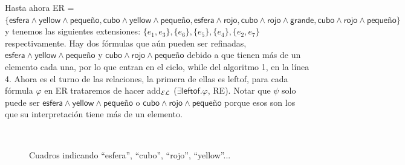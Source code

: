 Hasta ahora ER = $\{\textsf{esfera} \wedge \textsf{yellow} \wedge \textsf{peque\~no}, \textsf{cubo} \wedge \textsf{yellow} \wedge \textsf{peque\~no}, \textsf{esfera} \wedge \textsf{rojo}, \textsf{cubo} \wedge \textsf{rojo} \wedge \textsf{grande}, \textsf{cubo} \wedge \textsf{rojo} \wedge \textsf{peque\~no}\}$ 
y tenemos las siguientes extensiones: $\{e_1, e_3\}, \{e_6\}, \{e_5\}, \{e_4\}, \{e_2, e_7\}$ respectivamente. 
Hay dos f\'ormulas que a\'un pueden ser refinadas, $\textsf{esfera} \wedge \textsf{yellow} \wedge \textsf{peque\~no}$ y $\textsf{cubo} \wedge \textsf{rojo} \wedge \textsf{peque\~no}$ 
debido a que tienen m\'as de un elemento cada una, por lo que entran en el ciclo, while del algoritmo 1, en la l\'inea 4. Ahora es el turno de las relaciones, la primera de ellas es \textsf{leftof}, para cada f\'ormula $\varphi$ en ER trataremos de hacer add$_\mathcal{EL}$ ($\exists \textsf{leftof}.\varphi$, RE). Notar que $\psi$ solo puede ser $\textsf{esfera} \wedge \textsf{yellow} \wedge \textsf{peque\~no}$ o $\textsf{cubo} \wedge \textsf{rojo} \wedge \textsf{peque\~no}$ porque esos son los que su interpretaci\'on tiene m\'as de un elemento. 


\begin{figure}[ht]
\begin{center}
\\[0pt]
\caption{Cuadros indicando ``esfera'', ``cubo'', ``rojo'', ``yellow''...}
\label{fig-modelo15}
\end{center}
\end{figure}


